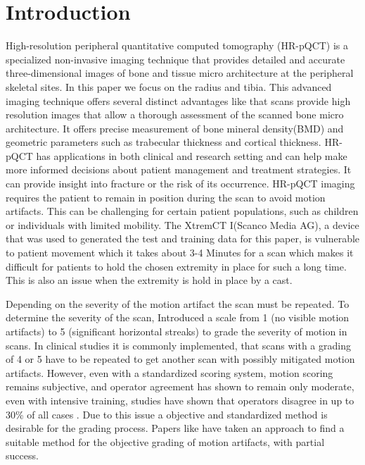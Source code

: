 \documentclass[
a4paper, 
12pt,
grayscalebody, %
abstract=on,
twoside, BCOR10mm, 12pt, DIV13,headinclude, footexclude, final, abstracton, openright
]{ibireprt}
\numberwithin{equation}{chapter}
\numberwithin{table}{chapter}
\numberwithin{figure}{chapter}
\numberwithin{algorithm}{chapter}
\numberwithin{example}{chapter}
\numberwithin{example}{chapter}
\begin{document}



\chapter{Introduction}

High-resolution peripheral quantitative computed tomography (HR-pQCT) is a specialized non-invasive imaging technique that provides detailed and accurate three-dimensional images of bone and tissue micro architecture at the peripheral skeletal sites. In this paper we focus  on the radius and tibia. This advanced imaging technique offers several distinct advantages like that scans provide high resolution images that allow a thorough assessment of the scanned bone micro architecture. It offers precise measurement of bone mineral density(BMD) and geometric parameters such as trabecular thickness and cortical thickness. HR-pQCT has applications in both clinical and research setting and can help make more informed decisions about patient management and treatment strategies. It can provide insight into fracture or the risk of its occurrence. HR-pQCT imaging requires the patient to remain in position during the scan to avoid motion artifacts. This can be challenging for certain patient populations, such as children or individuals with limited  mobility. The XtremCT I(Scanco Media AG), a device that  was used to generated the test and training data for this paper, is vulnerable to patient movement which it takes about 3-4 Minutes for a scan which makes it difficult for patients to hold the chosen extremity in place for such a long time. This is also an issue when the extremity is hold in place by a cast.

 Depending on the severity of the motion artifact the scan must be repeated. To determine the severity of the scan, \cite{Whittier2020} Introduced a scale from 1 (no visible motion artifacts) to 5 (significant horizontal streaks) to grade the severity of motion in scans. In clinical studies it is commonly implemented, that scans with a grading of 4 or 5 have to be repeated to get another scan with possibly mitigated motion artifacts. However, even with a standardized scoring system, motion scoring remains subjective, and operator agreement has shown to remain only moderate, even with intensive training, studies have shown that operators disagree in up to 30\% of all cases \cite{Walle2023}. Due to this issue a objective and standardized method is desirable for the grading process. Papers like \cite{Walle2023} have taken an approach to find a suitable method for the objective grading of motion artifacts, with partial success.
 
\end{document}
